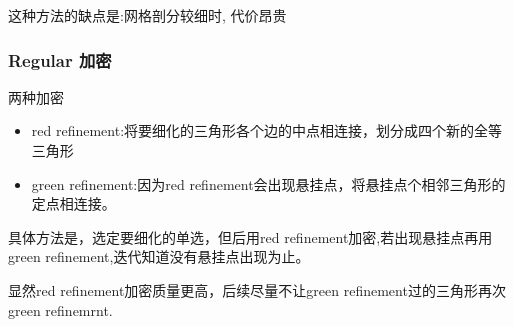 \documentclass{article}
\begin{document}
这种方法的缺点是:网格剖分较细时, 代价昂贵

\subsubsection{Regular 加密}

两种加密
\begin{itemize}
\item red refinement:将要细化的三角形各个边的中点相连接，划分成四个新的全等三角形
\item green refinement:因为red refinement会出现悬挂点，将悬挂点个相邻三角形的定点相连接。
\end{itemize}

具体方法是，选定要细化的单选，但后用red refinement加密,若出现悬挂点再用green refinement,迭代知道没有悬挂点出现为止。

显然red refinement加密质量更高，后续尽量不让green refinement过的三角形再次green refinemrnt.
\end{document}
